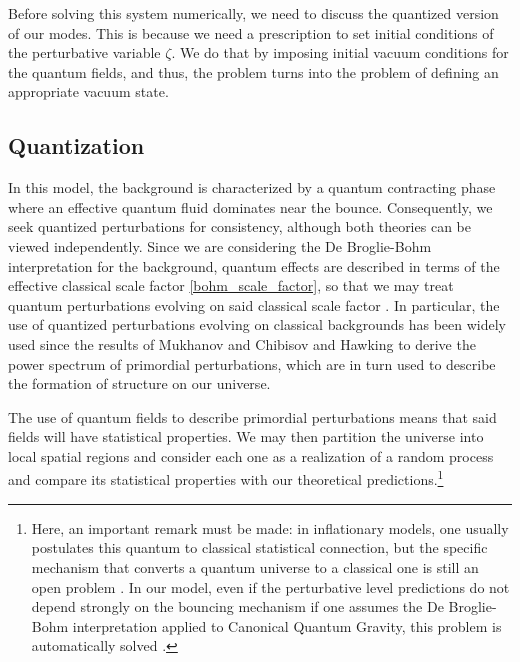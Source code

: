\documentclass[a4paper,11pt]{article}
\begin{document}
Before solving this system numerically, we need to discuss the quantized version of our modes. This is because we need a prescription to set initial conditions of the perturbative variable $\zeta$. We do that by imposing initial vacuum conditions for the quantum fields, and thus, the problem turns into the problem of defining an appropriate vacuum state.
 
\subsection{Quantization}

In this model, the background is characterized by a quantum contracting phase where an effective quantum fluid dominates near the bounce. Consequently, we seek quantized perturbations for consistency, although both theories can be viewed independently. {\color{red} Since we are considering the De Broglie-Bohm interpretation for the background, quantum effects are described in terms of the effective classical scale factor  \eqref{bohm_scale_factor}, so that we may treat quantum perturbations evolving on said classical scale factor \cite{Vitenti2013}}. In particular, the use of quantized perturbations evolving on classical backgrounds has been widely used since the results of Mukhanov and Chibisov \cite{mukhanov1981quantum} and Hawking \cite{hawking1982quantum_fluctuations} to derive the power spectrum of primordial perturbations, which are in turn used to describe the formation of structure on our universe.

The use of quantum fields to describe primordial perturbations means that said fields will have statistical properties. We may then partition the universe into local spatial regions and consider each one as a realization of a random process and compare its statistical properties with our theoretical predictions.\footnote{Here, an important remark must be made: in inflationary models, one usually postulates this quantum to classical statistical connection, but the specific mechanism that converts a quantum universe to a classical one is still an open problem \cite{nelson2021bouncing,mukhanov2005physical}. In our model, even if the perturbative level predictions do not depend strongly on the bouncing mechanism if one assumes the De Broglie-Bohm interpretation applied to Canonical Quantum Gravity, this problem is automatically solved \cite{nelson_bohm2023}. }
\end{document}
